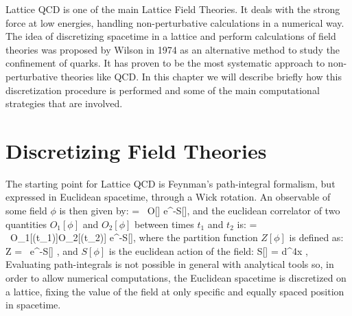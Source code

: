
Lattice QCD is one of the main Lattice Field Theories. It deals with the strong force at low energies, handling non-perturbative calculations in a numerical way. The idea of discretizing spacetime in a lattice and perform calculations of field theories was proposed by Wilson in 1974 \cite{wilson_confinement_1974} as an alternative method to study the confinement of quarks. It has proven to be the most systematic approach to non-perturbative theories like QCD. In this chapter we will describe briefly how this discretization procedure is performed and some of the main computational strategies that are involved.

\section{Discretizing Field Theories}

The starting point for Lattice QCD is Feynman's path-integral formalism, but expressed in Euclidean spacetime, through a Wick rotation. An observable of some field $\phi$ is then given by:
\beq
{} =  \int \D[\phi] ~O[\phi] e^{-S[\phi]},
\label{lattice:obs_base}
\eeq
and the euclidean correlator of two quantities $O_1[\phi]$ and $O_2[\phi]$ between times $t_1$ and $t_2$ is:
\beq
{} =  \int \D[\phi] ~O_1[\phi(t_1)]O_2[\phi(t_2)] e^{-S[\phi]},
\label{lattice:correlator}
\eeq
where the partition function $Z[\phi]$ is defined as:
\beq
	Z = \int \D[\phi] ~e^{-S[\phi]} ,
\eeq
and $S[\phi]$ is the euclidean action of the field:
\beq
S[\phi] = \int d^4x \Lagr [\phi] ,
\eeq
Evaluating path-integrals is not possible in general with analytical tools so, in order to allow numerical computations, the Euclidean spacetime is discretized on a lattice, fixing the value of the field at only specific and equally spaced position in spacetime. 


